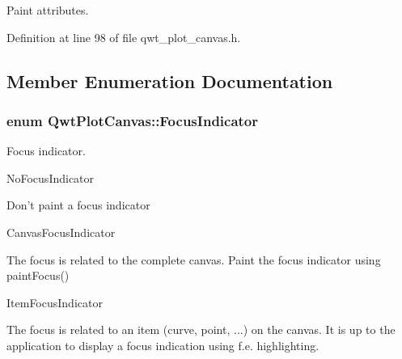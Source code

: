 Paint attributes. 



Definition at line 98 of file qwt\-\_\-plot\-\_\-canvas.\-h.



\subsection{Member Enumeration Documentation}
\hypertarget{class_qwt_plot_canvas_a89b44e4c28038a674ce211fe9ac2d7be}{
\subsubsection[{Focus\-Indicator}]{\setlength{\rightskip}{0pt plus 5cm}enum {\bf Qwt\-Plot\-Canvas\-::\-Focus\-Indicator}}}\label{class_qwt_plot_canvas_a89b44e4c28038a674ce211fe9ac2d7be}


Focus indicator. 


\begin{DoxyItemize}
\item No\-Focus\-Indicator\par
 Don't paint a focus indicator
\end{DoxyItemize}


\begin{DoxyItemize}
\item Canvas\-Focus\-Indicator\par
 The focus is related to the complete canvas. Paint the focus indicator using paint\-Focus()
\end{DoxyItemize}


\begin{DoxyItemize}
\item Item\-Focus\-Indicator\par
 The focus is related to an item (curve, point, ...) on the canvas. It is up to the application to display a focus indication using f.\-e. highlighting.
\end{DoxyItemize}

